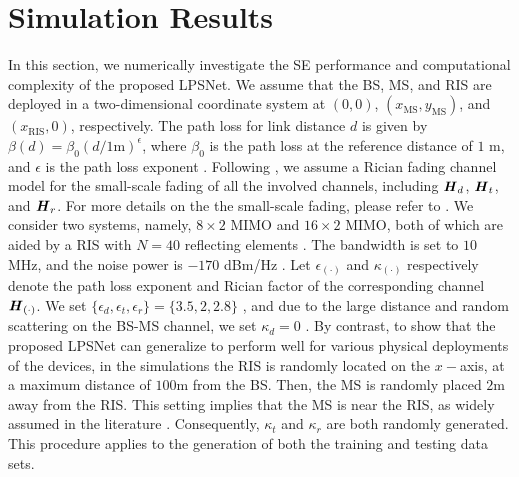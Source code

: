 \documentclass[conference]{IEEEtran}
\begin{document}
	\section{Simulation Results}
	\label{sec_sim_results}
	In this section, we numerically investigate the SE performance and computational complexity of the proposed LPSNet. We assume that the BS, MS, and RIS are deployed in a two-dimensional coordinate system at $(0,0)$, $(x_{\mathrm{MS}},y_{\mathrm{MS}})$, and $(x_{\mathrm{RIS}},0)$, respectively. The path loss for link distance $d$ is given by $\beta(d) = \beta_0 (d/1\mathrm{ m} )^{\epsilon}$, where $\beta_0$ is the path loss at the reference distance of $1$ m, and $\epsilon$ is the path loss exponent \cite{wu2019intelligent, zhang2020capacity}. Following \cite{zhang2020capacity, wu2019intelligent, nguyen2021hybrid}, we assume a Rician fading channel model for the small-scale fading of all the involved channels, including $\textbf{\textit{H}}_d$, $\textbf{\textit{H}}_t$, and $\textbf{\textit{H}}_r$. For more details on the the small-scale fading, please refer to \cite{zhang2020capacity, wu2019intelligent, nguyen2021hybrid}. We consider two systems, namely, $8 \times 2$ MIMO and $16 \times 2$ MIMO, both of which are aided by a RIS with $N=40$ reflecting elements \cite{zhang2020capacity, wu2019intelligent}. The bandwidth is set to $10$ MHz, and the noise power is $-170$ dBm/Hz \cite{zhang2020capacity}. Let $\epsilon_{(\cdot)}$ and $\kappa_{(\cdot)}$ respectively denote the path loss exponent and Rician factor of the corresponding channel $\textbf{\textit{H}}_{(\cdot)}$. We set $\{\epsilon_d,\epsilon_t,\epsilon_r\} = \{3.5,2,2.8\}$ \cite{wu2019intelligent}, and due to the large distance and random scattering on the BS-MS channel, we set $\kappa_d = 0$ \cite{wu2019intelligent}. By contrast, to show that the proposed LPSNet can generalize to perform well for various physical deployments of the devices, in the simulations the RIS is randomly located on the $x-$axis, at a maximum distance of $100$m from the BS. Then, the MS is randomly placed $2$m away from the RIS. This setting implies that the MS is near the RIS, as widely assumed in the literature \cite{wu2019intelligent, zhang2020capacity, nguyen2021spectral}. Consequently, $\kappa_t$ and $\kappa_r$ are both randomly generated. This procedure applies to the generation of both the training and testing data sets.
	
\end{document}
